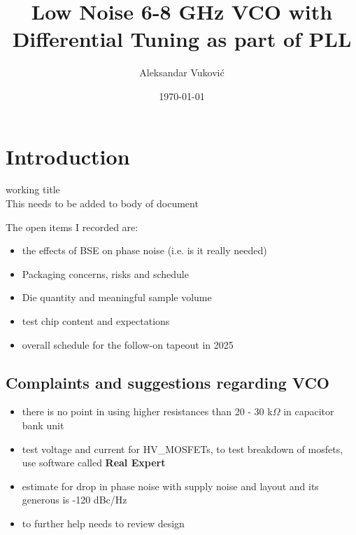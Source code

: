 \documentclass{article}
\title{Low Noise 6-8 GHz VCO with Differential Tuning as part of PLL} %
\author{Aleksandar Vuković} %
\date{\today} %
\begin{document}
\maketitle %


\section*{Introduction}

working title %
\\
This needs to be added to body of document %

The open items I recorded are:
\begin{itemize}
	\item the effects of BSE on phase noise (i.e. is it really needed)
	\item Packaging concerns, risks and schedule
	\item Die quantity and meaningful sample volume
	\item test chip content and expectations
	\item overall schedule for the follow-on tapeout in 2025
\end{itemize}
\subsection*{Complaints and suggestions regarding VCO} %

\begin{itemize}
	\item there is no point in using higher resistances than 20 - 30 k$\Omega$ in capacitor bank unit
	\item test voltage and current for HV\_MOSFETs, to test breakdown of mosfets, use software called \textbf{Real Expert} 
	\item estimate for drop in phase noise with supply noise and layout and its generous is -120 dBc/Hz %
	\item to further help needs to review design
\end{itemize}

\end{document}
